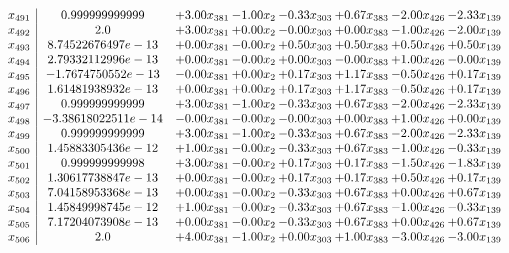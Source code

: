 \documentclass[8pt]{article}
\begin{document}
\[\begin{array}{c| c c@{\hskip 2pt} c@{\hskip 2pt} c@{\hskip 2pt} c@{\hskip 2pt} c@{\hskip 2pt} c@{\hskip 2pt} }
 x_{491}   &  0.999999999999 & +  3.00 x_{381} & -1.00 x_{2} & -0.33 x_{303} & +  0.67 x_{383} & -2.00 x_{426} & -2.33 x_{139}\\
 x_{492}   &  2.0 & +  3.00 x_{381} & +  0.00 x_{2} & -0.00 x_{303} & +  0.00 x_{383} & -1.00 x_{426} & -2.00 x_{139}\\
 x_{493}   &  8.74522676497e-13 & +  0.00 x_{381} & -0.00 x_{2} & +  0.50 x_{303} & +  0.50 x_{383} & +  0.50 x_{426} & +  0.50 x_{139}\\
 x_{494}   &  2.79332112996e-13 & +  0.00 x_{381} & -0.00 x_{2} & +  0.00 x_{303} & -0.00 x_{383} & +  1.00 x_{426} & -0.00 x_{139}\\
 x_{495}   &  -1.7674750552e-13 & -0.00 x_{381} & +  0.00 x_{2} & +  0.17 x_{303} & +  1.17 x_{383} & -0.50 x_{426} & +  0.17 x_{139}\\
 x_{496}   &  1.61481938932e-13 & +  0.00 x_{381} & +  0.00 x_{2} & +  0.17 x_{303} & +  1.17 x_{383} & -0.50 x_{426} & +  0.17 x_{139}\\
 x_{497}   &  0.999999999999 & +  3.00 x_{381} & -1.00 x_{2} & -0.33 x_{303} & +  0.67 x_{383} & -2.00 x_{426} & -2.33 x_{139}\\
 x_{498}   &  -3.38618022511e-14 & -0.00 x_{381} & -0.00 x_{2} & -0.00 x_{303} & +  0.00 x_{383} & +  1.00 x_{426} & +  0.00 x_{139}\\
 x_{499}   &  0.999999999999 & +  3.00 x_{381} & -1.00 x_{2} & -0.33 x_{303} & +  0.67 x_{383} & -2.00 x_{426} & -2.33 x_{139}\\
 x_{500}   &  1.45883305436e-12 & +  1.00 x_{381} & -0.00 x_{2} & -0.33 x_{303} & +  0.67 x_{383} & -1.00 x_{426} & -0.33 x_{139}\\
 x_{501}   &  0.999999999998 & +  3.00 x_{381} & -0.00 x_{2} & +  0.17 x_{303} & +  0.17 x_{383} & -1.50 x_{426} & -1.83 x_{139}\\
 x_{502}   &  1.30617738847e-13 & +  0.00 x_{381} & -0.00 x_{2} & +  0.17 x_{303} & +  0.17 x_{383} & +  0.50 x_{426} & +  0.17 x_{139}\\
 x_{503}   &  7.04158953368e-13 & +  0.00 x_{381} & -0.00 x_{2} & -0.33 x_{303} & +  0.67 x_{383} & +  0.00 x_{426} & +  0.67 x_{139}\\
 x_{504}   &  1.45849998745e-12 & +  1.00 x_{381} & -0.00 x_{2} & -0.33 x_{303} & +  0.67 x_{383} & -1.00 x_{426} & -0.33 x_{139}\\
 x_{505}   &  7.17204073908e-13 & +  0.00 x_{381} & -0.00 x_{2} & -0.33 x_{303} & +  0.67 x_{383} & +  0.00 x_{426} & +  0.67 x_{139}\\
 x_{506}   &  2.0 & +  4.00 x_{381} & -1.00 x_{2} & +  0.00 x_{303} & +  1.00 x_{383} & -3.00 x_{426} & -3.00 x_{139}\\

\end{array}\]
\end{document}
